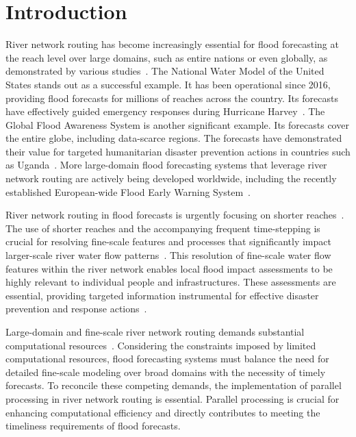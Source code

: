 \documentclass[water,article,submit,pdftex,moreauthors]{Definitions/mdpi}
\begin{document}
\section{Introduction}

River network routing has become increasingly essential for flood forecasting at the reach level over large domains, such as entire nations or even globally, as demonstrated by various studies~\cite{alfieri2013HESS, david2016ESS, maidment2017JAWRA, lin2018JHM, read2023JAWRA}. The National Water Model of the United States stands out as a successful example. It has been operational since 2016, providing flood forecasts for millions of reaches across the country. Its forecasts have effectively guided emergency responses during Hurricane Harvey~\cite{maidment2017JAWRA, read2023JAWRA}. The Global Flood Awareness System is another significant example. Its forecasts cover the entire globe, including data-scarce regions. The forecasts have demonstrated their value for targeted humanitarian disaster prevention actions in countries such as Uganda~\cite{alfieri2013HESS, coughlan_de_perez2016HESS}. More large-domain flood forecasting systems that leverage river network routing are actively being developed worldwide, including the recently established European-wide Flood Early Warning System~\cite{najafi2024NC, thober2019GMD}.

River network routing in flood forecasts is urgently focusing on shorter reaches~\cite{maidment2017JAWRA, coughlan_de_perez2016HESS, najafi2024NC, wada2016JAMES}. The use of shorter reaches and the accompanying frequent time-stepping is crucial for resolving fine-scale features and processes that significantly impact larger-scale river water flow patterns~\cite{yamazaki2009HESS, thober2019GMD, mizukami2021JAMES, nguyen-quang2018GMD}. This resolution of fine-scale water flow features within the river network enables local flood impact assessments to be highly relevant to individual people and infrastructures. These assessments are essential, providing targeted information instrumental for effective disaster prevention and response actions~\cite{maidment2017JAWRA, coughlan_de_perez2016HESS}.

Large-domain and fine-scale river network routing demands substantial computational resources~\cite{yamazaki2013WRR, liu2014EMS, mizukami2021JAMES, david2015WRR, liu2023JH}. Considering the constraints imposed by limited computational resources, flood forecasting systems must balance the need for detailed fine-scale modeling over broad domains with the necessity of timely forecasts. To reconcile these competing demands, the implementation of parallel processing in river network routing is essential. Parallel processing is crucial for enhancing computational efficiency and directly contributes to meeting the timeliness requirements of flood forecasts.
\end{document}
